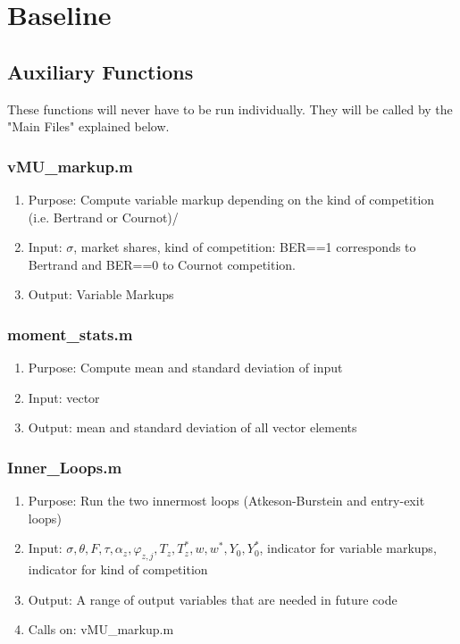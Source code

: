 \documentclass[12pt,a4paper,oneside]{article}
\begin{document}
\newpage

\section{Baseline}
\subsection{Auxiliary Functions}
These functions will never have to be run individually. They will be called by the "Main Files" explained below.
\subsubsection{vMU\_markup.m}
\begin{enumerate}
\item Purpose: Compute variable markup depending on the kind of competition (i.e. Bertrand or Cournot)/
\item Input: $\sigma$, market shares, kind of competition: BER==1 corresponds to Bertrand and BER==0 to Cournot
competition.
\item Output: Variable Markups
\end{enumerate}

\subsubsection{moment\_stats.m}
\begin{enumerate}
\item Purpose: Compute mean and standard deviation of input
\item Input: vector 
\item Output: mean and standard deviation of all vector elements
\end{enumerate}
\subsubsection{Inner\_Loops.m}
\begin{enumerate}
\item Purpose: Run the two innermost loops (Atkeson-Burstein and entry-exit loops) 
\item Input: $\sigma, \theta, F, \tau, \alpha_z, \varphi_{z,j}, T_z, T_z^*, w, w^*, Y_0, Y_0^*$, indicator for variable markups, indicator for kind of competition
\item Output: A range of output variables that are needed in future code
\item Calls on: vMU\_markup.m
\end{enumerate}
\end{document}
